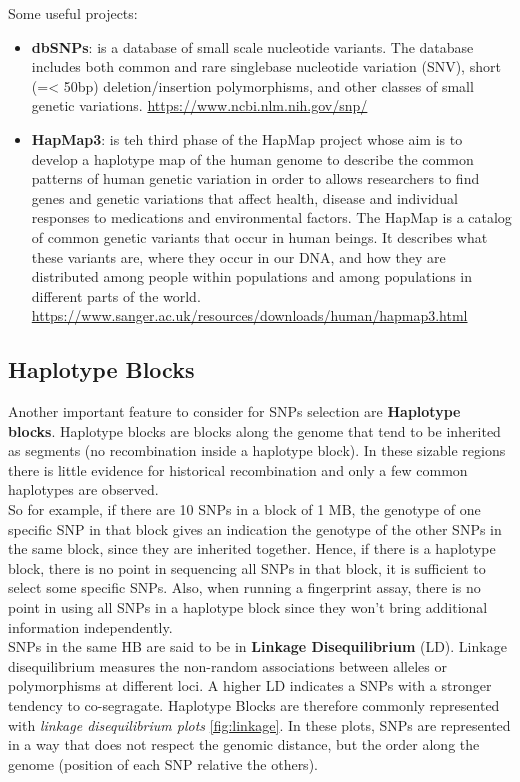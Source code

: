 \bigskip
Some useful projects:
\begin{itemize}
	\item \textbf{dbSNPs}: is a database of small scale nucleotide variants. The database includes both common and rare singlebase nucleotide variation (SNV), short (=< 50bp) deletion/insertion polymorphisms, and other classes of small genetic variations.
	\url{https://www.ncbi.nlm.nih.gov/snp/}
	
	\item \textbf{HapMap3}: is teh third phase of the HapMap project whose aim is to develop a haplotype map of the human genome to describe the common patterns of human genetic variation in order to allows researchers to find genes and genetic variations that affect health, disease and individual responses to medications and environmental factors. The HapMap is a catalog of common genetic variants that occur in human beings. It describes what these variants are, where they occur in our DNA, and how they are distributed among people within populations and among populations in different parts of the world.
	\url{https://www.sanger.ac.uk/resources/downloads/human/hapmap3.html}
\end{itemize}

\subsection{Haplotype Blocks}

Another important feature to consider for SNPs selection are \textbf{Haplotype blocks}. Haplotype blocks are blocks along the genome that tend to be inherited as segments (no recombination inside a haplotype block). In these sizable regions there is little evidence for historical recombination and only a few common haplotypes are observed. \\

So for example, if there are 10 SNPs in a block of 1 MB, the genotype of one specific SNP in that block gives an indication the genotype of the other SNPs in the same block, since they are inherited together. 
Hence, if there is a haplotype block, there is no point in sequencing all SNPs in that block, it is sufficient to select some specific SNPs. Also, when running a fingerprint assay, there is no point in using all SNPs in a haplotype block since they won't bring additional information independently.\\

SNPs in the same HB are said to be in \textbf{Linkage Disequilibrium} (LD). Linkage disequilibrium measures the non-random associations between alleles or polymorphisms at different loci. A higher LD indicates a SNPs with a stronger tendency to co-segragate.
Haplotype Blocks are therefore commonly represented with \emph{linkage disequilibrium plots} \ref{fig:linkage}. In these plots, SNPs are represented in a way that does not respect the genomic distance, but the order along the genome (position of each SNP relative the others). 

